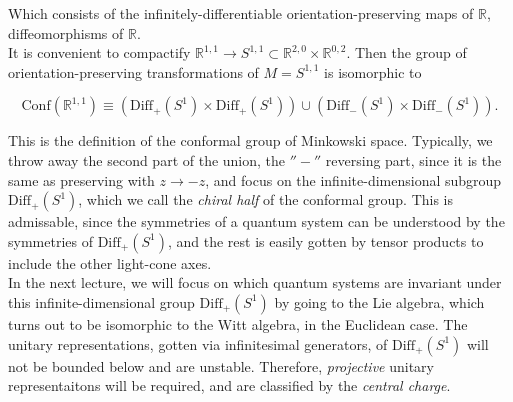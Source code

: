 \noindent Which consists of the infinitely-differentiable orientation-preserving maps of $\mathbb{R}$, diffeomorphisms of $\mathbb{R}$. \\

\noindent It is convenient to compactify $\mathbb{R}^{1,1} \rightarrow S^{1,1} \subset \mathbb{R}^{2,0} \times \mathbb{R}^{0,2}$. Then the group of orientation-preserving transformations of $M=S^{1,1}$ is isomorphic to 

\begin{equation}
\text{Conf} (\mathbb{R}^{1,1}) \equiv (\text{Diff}_+ (S^1) \times \text{Diff}_+ (S^1)) \cup (\text{Diff}_- (S^1) \times \text{Diff}_- (S^1)).
\end{equation}

\noindent This is the definition of the conformal group of Minkowski space. Typically, we throw away the second part of the union, the $''-''$ reversing part, since it is the same as preserving with $z \rightarrow -z$, and focus on the infinite-dimensional subgroup $\text{Diff}_+ (S^1)$, which we call the \textit{chiral half} of the conformal group. This is admissable, since the symmetries of a quantum system can be understood by the symmetries of $\text{Diff}_+ (S^1)$, and the rest is easily gotten by tensor products to include the other light-cone axes. \\

\noindent In the next lecture, we will focus on which quantum systems are invariant under this infinite-dimensional group $\text{Diff}_+ (S^1)$ by going to the Lie algebra, which turns out to be isomorphic to the Witt algebra, in the Euclidean case. The unitary representations, gotten via infinitesimal generators, of $\text{Diff}_+ (S^1)$ will not be bounded below and are unstable. Therefore, \textit{projective} unitary representaitons will be required, and are classified by the \textit{central charge}.